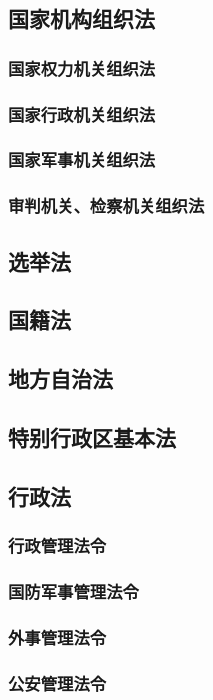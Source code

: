 \documentclass[UTF8]{../ApplicationUniverse}
\begin{document}
    \subsection{国家机构组织法}
        \subsubsection{国家权力机关组织法}
        \subsubsection{国家行政机关组织法}
        \subsubsection{国家军事机关组织法}
        \subsubsection{审判机关、检察机关组织法}

    \subsection{选举法}
    \subsection{国籍法}
    \subsection{地方自治法}
    \subsection{特别行政区基本法}
    \subsection{行政法}
        \subsubsection{行政管理法令}
        \subsubsection{国防军事管理法令}
        \subsubsection{外事管理法令}
        \subsubsection{公安管理法令}
\end{document}
